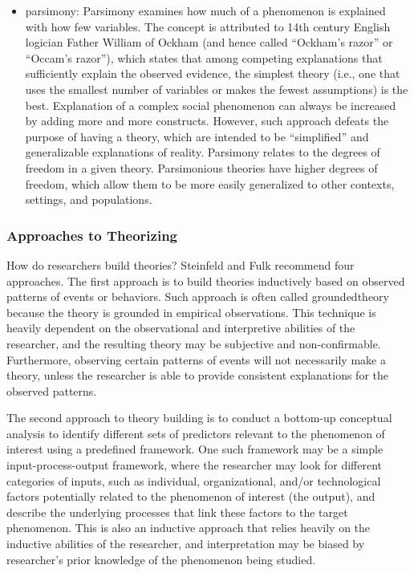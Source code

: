 \begin{itemize}
	\item \Gls{parsimony}: Parsimony examines how much of a phenomenon is explained with how few variables. The concept is attributed to 14th century English logician Father William of Ockham (and hence called ``Ockham's razor'' or ``Occam's razor''), which states that among competing explanations that sufficiently explain the observed evidence, the simplest theory (i.e., one that uses the smallest number of variables or makes the fewest assumptions) is the best. Explanation of a complex social phenomenon can always be increased by adding more and more constructs. However, such approach defeats the purpose of having a theory, which are intended to be ``simplified'' and generalizable explanations of reality. Parsimony relates to the degrees of freedom in a given theory. Parsimonious theories have higher degrees of freedom, which allow them to be more easily generalized to other contexts, settings, and populations.

\end{itemize}

\subsubsection{Approaches to Theorizing}

How do researchers build theories? Steinfeld and Fulk\cite{steinfield1990theory} recommend four approaches. The first approach is to build theories inductively based on observed patterns of events or behaviors. Such approach is often called \gls{groundedtheory} because the theory is grounded in empirical observations. This technique is heavily dependent on the observational and interpretive abilities of the researcher, and the resulting theory may be subjective and non-confirmable. Furthermore, observing certain patterns of events will not necessarily make a theory, unless the researcher is able to provide consistent explanations for the observed patterns. 

The second approach to theory building is to conduct a bottom-up conceptual analysis to identify different sets of predictors relevant to the phenomenon of interest using a predefined framework. One such framework may be a simple input-process-output framework, where the researcher may look for different categories of inputs, such as individual, organizational, and/or technological factors potentially related to the phenomenon of interest (the output), and describe the underlying processes that link these factors to the target phenomenon. This is also an inductive approach that relies heavily on the inductive abilities of the researcher, and interpretation may be biased by researcher's prior knowledge of the phenomenon being studied.


